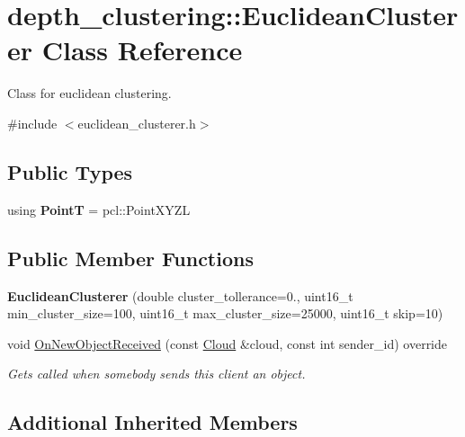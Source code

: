 \hypertarget{classdepth__clustering_1_1EuclideanClusterer}{}\section{depth\+\_\+clustering\+:\+:Euclidean\+Clusterer Class Reference}
\label{classdepth__clustering_1_1EuclideanClusterer}


Class for euclidean clustering.  




{\ttfamily \#include $<$euclidean\+\_\+clusterer.\+h$>$}

\subsection*{Public Types}
\begin{DoxyCompactItemize}
\item 
\mbox{\label{classdepth__clustering_1_1EuclideanClusterer_a7c8df2531faab16c7156087cd62d31ca}} 
using {\bfseries PointT} = pcl\+::\+Point\+X\+Y\+ZL
\end{DoxyCompactItemize}
\subsection*{Public Member Functions}
\begin{DoxyCompactItemize}
\item 
\mbox{\label{classdepth__clustering_1_1EuclideanClusterer_a1c8b10d1977bf4c1f463d2f1942526df}} 
{\bfseries Euclidean\+Clusterer} (double cluster\+\_\+tollerance=0., uint16\+\_\+t min\+\_\+cluster\+\_\+size=100, uint16\+\_\+t max\+\_\+cluster\+\_\+size=25000, uint16\+\_\+t skip=10)
\item 
void \hyperlink{classdepth__clustering_1_1EuclideanClusterer_a8ebdd098c514a05f17f16070255b27a6}{On\+New\+Object\+Received} (const \hyperlink{classdepth__clustering_1_1Cloud}{Cloud} \&cloud, const int sender\+\_\+id) override
\begin{DoxyCompactList}\small\item\em Gets called when somebody sends this client an object. \end{DoxyCompactList}\end{DoxyCompactItemize}
\subsection*{Additional Inherited Members}


